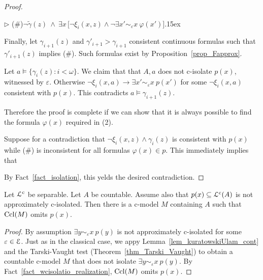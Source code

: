 \documentclass{amsproc}
\newcommand{\mylabel}[1]{{#1}\hfill}
\renewenvironment{itemize}
  {\begin{list}{$\triangleright$}{%
  \setlength{\parskip}{0mm}
  \setlength{\topsep}{.4\baselineskip}
  \setlength{\rightmargin}{0mm}
  \setlength{\listparindent}{0mm}
  \setlength{\itemindent}{0mm}
  \setlength{\labelwidth}{3ex}
  \setlength{\itemsep}{.2\baselineskip}
  \setlength{\parsep}{.2\baselineskip}
  \setlength{\partopsep}{0mm}
  \setlength{\labelsep}{1ex}
  \setlength{\leftmargin}{\labelwidth+\labelsep}
  \let\makelabel\mylabel}}{%
\end{list}}
\begin{document}
{\begin{proof}
\begin{itemize}
  (\#)\hfil $\neg\tilde{\gamma}(z)\ \wedge\ \exists x\,\big[\neg\xi_i(x,z)\wedge\neg\exists x'\sim_\varepsilon\! x\ \varphi(x')\big].$\kern15ex
  
  Finally, let $\gamma_{i+1}(z)$ and $\gamma'_{i+1}>\gamma_{i+1}$ consistent continuous formulas such that $\gamma'_{i+1}(z)$ implies (\#).
  Such formulas exist by Proposition~\ref{prop_Fapprox}.
  \end{itemize}
  
  Let $a\models\{\gamma_i(z):i<\omega\}$.
  We claim that that $A,a$ does not c-isolate $p(x)$, witnessed by $\varepsilon$.
  Otherwise $\neg\xi_i(x,a)\rightarrow\exists x'\sim_\varepsilon\! x\  p(x')$ for some $\neg\xi_i(x,a)$ consistent with $p(x)$.
  This contradicts $a\models\gamma_{i+1}(z)$.
  
  Therefore the proof is complete if we can show that it is always possible to find the formula $\varphi(x)$ required in (2).
  
  Suppose for a contradiction that $\neg\xi_i(x,z)\wedge\gamma_i(z)$ is consistent with $p(x)$ while (\#) is inconsistent for all formulas $\varphi(x)\in p$.
  This immediately implies that 
  
  
  By Fact~\ref{fact_isolation}, this yelds the desired contradiction.
\end{proof}

\begin{theorem}\label{thm_cOTT}
  Let ${\EuScript L}^{\rm c}$ be separable.
  Let $A$ be countable.
  Assume also that $p(x)\subseteq{\EuScript L}^{\rm c}(A)$ is not approximately c-isolated.
  Then there is a c-model $M$ containing $A$ such that ${\rm Ccl}(M)$ omits $p(x)$. 
\end{theorem}

\begin{proof}
  By assumption $\exists y\sim_\varepsilon\! x\ p(y)$ is not approximately c-isolated for some $\varepsilon\in{\EuScript E}$. 
  Just as in the classical case, we appy Lemma~\ref{lem_kuratowskiUlam_cont} and the Tarski-Vaught test (Theorem~\ref{thm_Tarski_Vaught}) to obtain a countable c-model $M$ that does not isolate $\exists y\sim_\varepsilon\! x\ p(y)$.
  By Fact~\ref{fact_wcisolatio_realization}, ${\rm Ccl}(M)$ omits $p(x)$. 
\end{proof}

}
\end{document}

